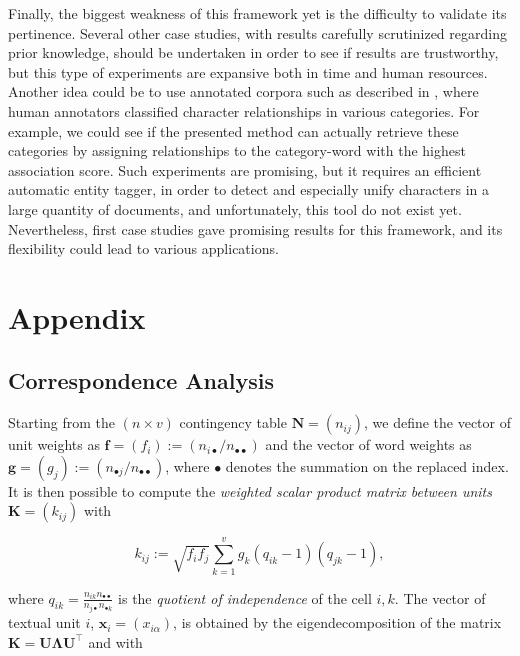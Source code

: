\documentclass[
twocolumn,
]{ceurart}
\begin{document}
Finally, the biggest weakness of this framework yet is the difficulty to validate its pertinence. Several other case studies, with results carefully scrutinized regarding prior knowledge, should be undertaken in order to see if results are trustworthy, but this type of experiments are expansive both in time and human resources. Another idea could be to use annotated corpora such as described in \cite{Massey2015}, where human annotators classified character relationships in various categories. For example, we could see if the presented method can actually retrieve these categories by assigning relationships to the category-word with the highest association score. Such experiments are promising, but it requires an efficient automatic entity tagger, in order to detect and especially unify characters in a large quantity of documents, and unfortunately, this tool do not exist yet. Nevertheless, first case studies gave promising results for this framework, and its flexibility could lead to various applications.

\appendix

\section{Appendix}

\subsection{Correspondence Analysis}
\label{ca_details}

Starting from the $(n \times v)$ contingency table $\mathbf{N} = (n_{ij})$, we define the vector of unit weights as $\mathbf{f} = (f_i) := (n_{i\bullet}/n_{\bullet \bullet})$ and the vector of word weights as $\mathbf{g} = (g_j) := (n_{\bullet j}/n_{\bullet \bullet})$, where $\bullet$ denotes the summation on the replaced index. It is then possible to compute the \emph{weighted scalar product matrix between units} $\mathbf{K} = (k_{ij})$ with

\begin{equation}
k_{ij} := \sqrt{f_i f_j} \sum_{k=1}^{v} g_k(q_{ik} - 1)(q_{jk} - 1), 
\end{equation}

where $q_{ik} = \frac{n_{ik} n_{\bullet \bullet}}{n_{j \bullet} n_{\bullet k}}$ is the \emph{quotient of independence} of the cell $i, k$. The vector of textual unit $i$, $\mathbf{x}_i = (x_{i\alpha})$, is obtained by the eigendecomposition of the matrix $\mathbf{K} = \mathbf{U}\bm{\Lambda}\mathbf{U}^\top$ and with
\end{document}
